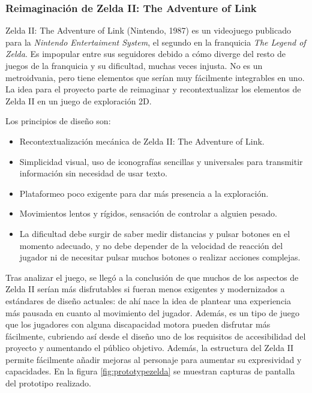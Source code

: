 \subsubsection{Reimaginación de Zelda II: The Adventure of Link}

Zelda II: The Adventure of Link (Nintendo, 1987) es un videojuego publicado para la \textit{Nintendo Entertaiment System}, el segundo en la franquicia \textit{The Legend of Zelda}. Es impopular entre sus seguidores debido a cómo diverge del resto de juegos de la franquicia y su dificultad, muchas veces injusta. No es un metroidvania, pero tiene elementos que serían muy fácilmente integrables en uno. La idea para el proyecto parte de reimaginar y recontextualizar los elementos de Zelda II en un juego de exploración 2D.

Los principios de diseño son:
\begin{itemize}
    \item Recontextualización mecánica de Zelda II: The Adventure of Link.
    \item Simplicidad visual, uso de iconografías sencillas y universales para transmitir información sin necesidad de usar texto.
    \item Plataformeo poco exigente para dar más presencia a la exploración.
    \item Movimientos lentos y rígidos, sensación de controlar a alguien pesado.
    \item La dificultad debe surgir de saber medir distancias y pulsar botones en el momento adecuado, y no debe depender de la velocidad de reacción del jugador ni de necesitar pulsar muchos botones o realizar acciones complejas.
\end{itemize}

Tras analizar el juego, se llegó a la conclusión de que muchos de los aspectos de Zelda II serían más disfrutables si fueran menos exigentes y modernizados a estándares de diseño actuales: de ahí nace la idea de plantear una experiencia más pausada en cuanto al movimiento del jugador. Además, es un tipo de juego que los jugadores con alguna discapacidad motora pueden disfrutar más fácilmente, cubriendo así desde el diseño uno de los requisitos de accesibilidad del proyecto y aumentando el público objetivo. Además, la estructura del Zelda II permite fácilmente añadir mejoras al personaje para aumentar su expresividad y capacidades. En la figura \ref{fig:prototypezelda} se muestran capturas de pantalla del prototipo  realizado.


